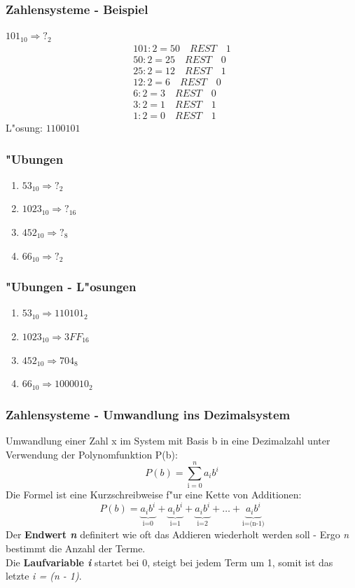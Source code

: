 \documentclass{beamer}
\begin{document}
\frame
{
	\frametitle{Zahlensysteme - Beispiel}
	$101_{10} \Rightarrow ?_2$\\
	\vspace{3mm}
	\begin{displaymath}
	\begin{array}{ll}
	101 : 2 = 50 \quad REST \quad 1 \\
	50 : 2 = 25 \quad REST \quad 0 \\
	25 : 2 = 12 \quad REST \quad 1 \\
	12 : 2 = 6 \quad REST \quad 0 \\
	6: 2 = 3 \quad REST \quad 0 \\
	3 : 2 = 1 \quad REST \quad 1 \\
	1 : 2 = 0 \quad REST \quad 1
	\end{array}
	\end{displaymath}
	\vspace{3mm}
	L"osung: $1100101$
}

\frame
{
	\frametitle{"Ubungen}
	\begin{enumerate}
	\item $53_{10} \Rightarrow ?_2$
	\item $1023_{10} \Rightarrow ?_{16}$
	\item $452_{10} \Rightarrow ?_8$
	\item $66_{10} \Rightarrow ?_2$
	\end{enumerate}
}

\frame
{
	\frametitle{"Ubungen - L"osungen}
	\begin{enumerate}
	\item $53_{10} \Rightarrow 110101_2$
	\item $1023_{10} \Rightarrow 3FF_{16}$
	\item $452_{10} \Rightarrow 704_8$
	\item $66_{10} \Rightarrow 1000010_2$
	\end{enumerate}
}

\frame 
{
	\frametitle{Zahlensysteme - Umwandlung ins Dezimalsystem}
	Umwandlung einer Zahl x im System mit Basis b in eine Dezimalzahl unter Verwendung der Polynomfunktion P(b):
	\begin{displaymath}
	P(b) = \sum_{\mathrm{i}=0}^{n} a_\mathit{i} b^\mathit{i}
	\end{displaymath}		
	Die Formel ist eine Kurzschreibweise f"ur eine Kette von Additionen:
	\begin{displaymath}
	P(b)= \underbrace{a_i b^i}_\text{i=0} + \underbrace{a_i b^i}_\text{i=1} + \underbrace{a_i b^i}_\text{i=2} + \dots + \underbrace{a_i b^i}_\text{i=(n-1)}
	\end{displaymath}	
	Der \textbf{Endwert \textit{n}} definitert wie oft das Addieren wiederholt werden soll - Ergo \textit{n} bestimmt die Anzahl der Terme.\\
	Die \textbf{Laufvariable \textit{i}} startet bei 0, steigt bei jedem Term um 1, somit ist das letzte {\it i = (n - 1)}.	
}
\end{document}
